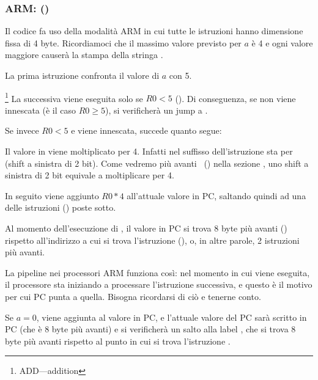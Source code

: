 \subsubsection{ARM: \OptimizingKeilVI (\ARMMode)}
\label{sec:SwitchARMLot}



Il codice fa uso della modalità ARM in cui tutte le istruzioni hanno dimensione fissa di 4 byte.
Ricordiamoci che il massimo valore previsto per $a$ è 4 e ogni valore maggiore causerà la stampa della stringa 
.

La prima istruzione  confronta il valore di $a$ con 5.

\footnote{ADD---addition}
La successiva  viene eseguita solo se $R0 < 5$ (). 
Di conseguenza, se  non viene innescata (è il caso $R0 \geq 5$), si verificherà un jump a .

Se invece $R0 < 5$ e  viene innescata, succede quanto segue:

Il valore in  viene moltiplicato per 4.
Infatti  nel suffisso dell'istruzione sta per  (shift a sinistra di 2 bit).
Come vedremo più avanti ~() nella sezione \q{\ShiftsSectionName}, uno shift a sinistra
di 2 bit equivale a moltiplicare per 4.

In seguito viene aggiunto $R0*4$ all'attuale valore in \ac{PC}, saltando quindi ad una delle istruzioni  () poste sotto.

Al momento dell'esecuzione di , il valore in \ac{PC} si trova 8 byte più avanti ()
rispetto all'indirizzo a cui si trova l'istruzione  (), 
o, in altre parole, 2 istruzioni più avanti.


La pipeline nei processori ARM funziona così: nel momento in cui  viene eseguita,
il processore sta iniziando a processare l'istruzione successiva, e questo è il motivo per cui \ac{PC} punta a quella.
Bisogna ricordarsi di ciò e tenerne conto.

Se $a=0$, viene aggiunta al valore in \ac{PC},
e l'attuale valore del \ac{PC} sarà scritto in \ac{PC} (che è 8 byte più avanti)
e si verificherà un salto alla label ,
che si trova 8 byte più avanti rispetto al punto in cui si trova l'istruzione .

